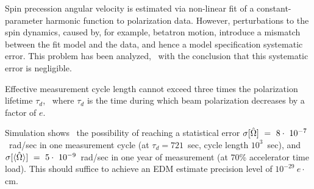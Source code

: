 Spin precession angular velocity is estimated via non-linear fit of a constant-parameter harmonic function to polarization data. However, perturbations to the spin dynamics, caused by, for example, betatron motion, introduce a mismatch between the fit model and the data, and hence a model specification systematic error. This problem has been analyzed,~\cite{Aksentev:IPAC19:SMP} with the conclusion that this systematic error is negligible.

Effective measurement cycle length cannot exceed three times the polarization lifetime $\tau_d$,~\cite{Stats} where $\tau_d$ is the time during which beam polarization decreases by a factor of $e$.

Simulation shows~\cite{Stats} the possibility of reaching a statistical error $\sigma[\hat{\Omega}]~=~8\cdot~10^{-7}$~rad/sec in one measurement cycle (at $\tau_d = 721$~sec, cycle length $10^3$~sec), and $\sigma[\langle{\hat{\Omega}}\rangle]~=~5\cdot~10^{-9}$~rad/sec in one year of measurement (at 70\% accelerator time load). This should suffice to achieve an EDM estimate precision level of $10^{-29}~e\cdot$cm.
